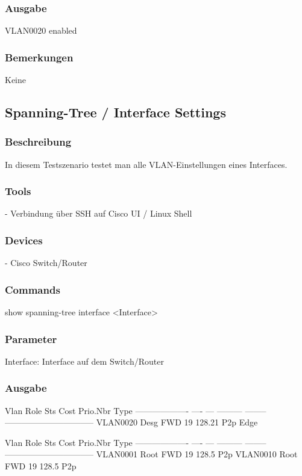 \documentclass[a4,12pt]{scrartcl}
\begin{document}
\subsubsection{Ausgabe}
VLAN0020            enabled
\subsubsection{Bemerkungen}
Keine


\subsection{Spanning-Tree / Interface Settings}
\subsubsection{Beschreibung}
In diesem Testszenario testet man alle VLAN-Einstellungen eines Interfaces.
\subsubsection{Tools}
- Verbindung über SSH auf Cisco UI / Linux Shell
\subsubsection{Devices}
- Cisco Switch/Router
\subsubsection{Commands}
show spanning-tree interface <Interface>
\subsubsection{Parameter}
Interface: Interface auf dem Switch/Router
\subsubsection{Ausgabe}
Vlan                Role Sts Cost      Prio.Nbr Type\newline
------------------- ---- --- --------- -------- --------------------------------\newline
VLAN0020            Desg FWD 19        128.21   P2p Edge\newline

Vlan                Role Sts Cost      Prio.Nbr Type\newline
------------------- ---- --- --------- -------- --------------------------------\newline
VLAN0001            Root FWD 19        128.5    P2p\newline
VLAN0010            Root FWD 19        128.5    P2p\newline
\end{document}
